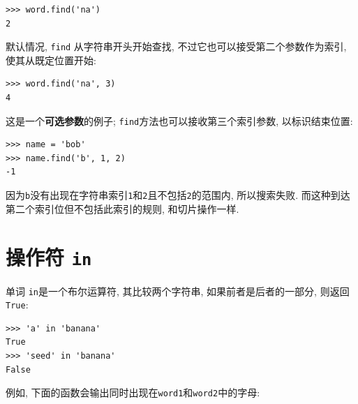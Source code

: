 \documentclass[10pt]{book}
\begin{document}
\begin{verbatim}
>>> word.find('na')
2
\end{verbatim}
%
默认情况, {\tt find} 从字符串开头开始查找, 不过它也可以接受第二个参数作为索引, 
使其从既定位置开始:

\begin{verbatim}
>>> word.find('na', 3)
4
\end{verbatim}
%
这是一个{\bf 可选参数}的例子;
{\tt find}方法也可以接收第三个索引参数, 以标识结束位置:

\begin{verbatim}
>>> name = 'bob'
>>> name.find('b', 1, 2)
-1
\end{verbatim}
%
因为{\tt b}没有出现在字符串索引{\tt 1}和{\tt 2}且不包括{\tt 2}的范围内, 
所以搜索失败. 
而这种到达第二个索引位但不包括此索引的规则, 和切片操作一样. 

\section{操作符 {\tt in}}
\label{inboth}

单词 {\tt in}是一个布尔运算符, 其比较两个字符串, 
如果前者是后者的一部分, 
则返回{\tt True}:

\begin{verbatim}
>>> 'a' in 'banana'
True
>>> 'seed' in 'banana'
False
\end{verbatim}
%
例如, 下面的函数会输出同时出现在{\tt word1}和{\tt word2}中的字母:
\end{document}
